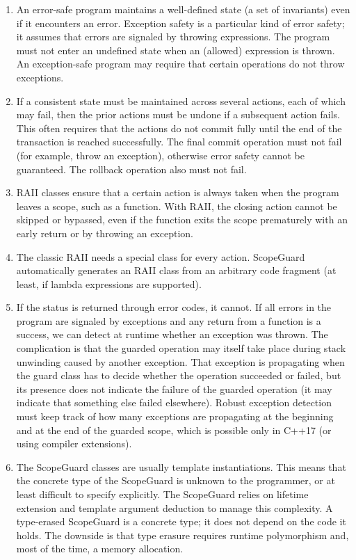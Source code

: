 \begin{enumerate}
\item
  An error-safe program maintains a well-defined state (a set of invariants) even if it encounters an error. Exception safety is a particular kind of error safety; it assumes that errors are signaled by throwing expressions. The program must not enter an undefined state when an (allowed) expression is thrown. An exception-safe program may require that certain operations do not throw exceptions.
\item
  If a consistent state must be maintained across several actions, each of which may fail, then the prior actions must be undone if a subsequent action fails. This often requires that the actions do not commit fully until the end of the transaction is reached successfully. The final commit operation must not fail (for example, throw an exception), otherwise error safety cannot be guaranteed. The rollback operation also must not fail.
\item
  RAII classes ensure that a certain action is always taken when the program leaves a scope, such as a function. With RAII, the closing action cannot be skipped or bypassed, even if the function exits the scope prematurely with an early return or by throwing an exception.
\item
  The classic RAII needs a special class for every action. ScopeGuard automatically generates an RAII class from an arbitrary code fragment (at least, if lambda expressions are supported).
\item
  If the status is returned through error codes, it cannot. If all errors in the program are signaled by exceptions and any return from a function is a success, we can detect at runtime whether an exception was thrown. The complication is that the guarded operation may itself take place during stack unwinding caused by another exception. That exception is propagating when the guard class has to decide whether the operation succeeded or failed, but its presence does not indicate the failure of the guarded operation (it may indicate that something else failed elsewhere). Robust exception detection must keep track of how many exceptions are propagating at the beginning and at the end of the guarded scope, which is possible only in C++17 (or using compiler extensions).
\item
  The ScopeGuard classes are usually template instantiations. This means that the concrete type of the ScopeGuard is unknown to the programmer, or at least difficult to specify explicitly. The ScopeGuard relies on lifetime extension and template argument deduction to manage this complexity. A type-erased ScopeGuard is a concrete type; it does not depend on the code it holds. The downside is that type erasure requires runtime polymorphism and, most of the time, a memory allocation.
\end{enumerate}

